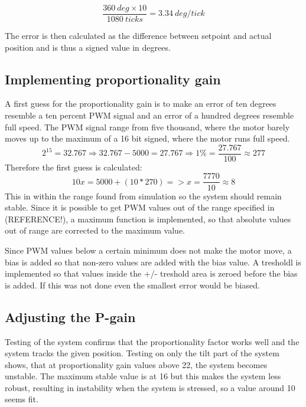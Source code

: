 \begin{equation}
\frac{360 \ deg \times 10}{1080 \ ticks} = 3.34\ deg/tick 
\end{equation}

The error is then calculated as the difference between setpoint and actual position and is thus a signed value in degrees.

\subsection{Implementing proportionality gain}
A first guess for the proportionality gain is to make an error of ten degrees resemble a ten percent PWM signal and an error of a hundred degrees resemble full speed. The PWM signal range from five thousand, where the motor barely moves up to the maximum of a 16 bit signed, where the motor runs full speed.
\begin{equation}
2^{15} = 32.767 \Rightarrow 
32.767 - 5000 = 27.767 \Rightarrow 
1 \% = \frac{27.767}{100} \approx  277
	\label{eq:PWM}
\end{equation}
 Therefore the first guess is calculated:
\begin{equation}
10x = 5000 + (10 * 270) => x = \frac{7770}{10} \approx  8
	\label{eq:P-term}
\end{equation}
This in within the range found from simulation so the system should remain stable. Since it is possible to get PWM values out of the range specified in (REFERENCE!), a maximum function is implemented, so that absolute values out of range are corrected to the maximum value.

Since PWM values below a certain minimum does not make the motor move, a bias is added so that non-zero values are added with the bias value. A tresholdl is implemented so that values inside the +/- treshold area is zeroed before the bias is added. If this was not done even the smallest error would be biased.

\subsection{Adjusting the P-gain}
Testing of the system confirms that the proportionality factor works well and the system tracks the given position. Testing on only the tilt part of the system shows, that at proportionality gain values above 22, the system becomes unstable. The maximum stable value is at 16 but this makes the system less robust, resulting in instability when the system is stressed, so a value around 10 seems fit.

